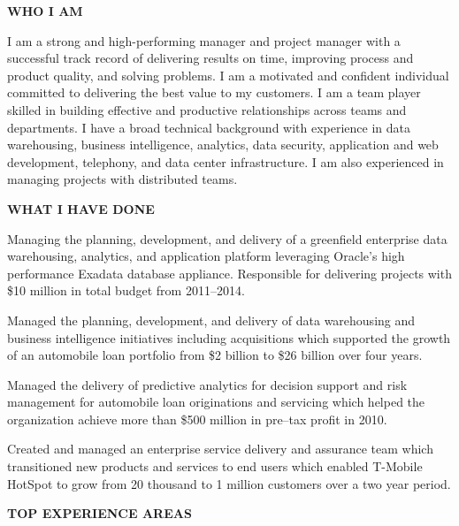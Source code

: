 \documentclass{article}
\newcommand{\sbt}{\,\begin{picture}(-1,1)(-1,-3)\circle*{3}\end{picture}\ }
\newenvironment{tightcenter}{%
  \setlength\topsep{0pt}
  \setlength\parskip{10pt}
  \begin{center}
}{%
  \end{center}
}
\begin{document}
\begin{tightcenter}
{\bfseries \large WHO I AM}
\end{tightcenter}

\noindent
I am a strong and high-performing manager and project manager with a successful track record of delivering results on time, improving process and product quality, and solving problems. I am a motivated and confident individual committed to delivering the best value to my customers. I am a team player skilled in building effective and productive relationships across teams and departments. I have a broad technical background with experience in data warehousing, business intelligence, analytics, data security, application and web development, telephony, and data center infrastructure. I am also experienced in managing projects with distributed teams.

\begin{tightcenter}
{\bfseries \large WHAT I HAVE DONE}
\end{tightcenter}

\begin{compactitem}
\item[\sbt] Managing the planning, development, and delivery of a greenfield enterprise data warehousing, analytics, and application platform leveraging Oracle's high performance Exadata database appliance. Responsible for delivering projects with \$10 million in total budget from 2011--2014.
\item[\sbt] Managed the planning, development, and delivery of data warehousing and business intelligence initiatives including acquisitions which supported the growth of an automobile loan portfolio from \$2 billion to \$26 billion over four years.
\item[\sbt] Managed the delivery of predictive analytics for decision support and risk management for automobile loan originations and servicing which helped the organization achieve more than \$500 million in pre--tax profit in 2010.
\item[\sbt] Created and managed an enterprise service delivery and assurance team which transitioned new products and services to end users which enabled T-Mobile HotSpot to grow from 20 thousand to 1 million customers over a two year period.
\end{compactitem}

\begin{tightcenter}
{\bfseries \large TOP EXPERIENCE AREAS}
\end{tightcenter}
\end{document}
